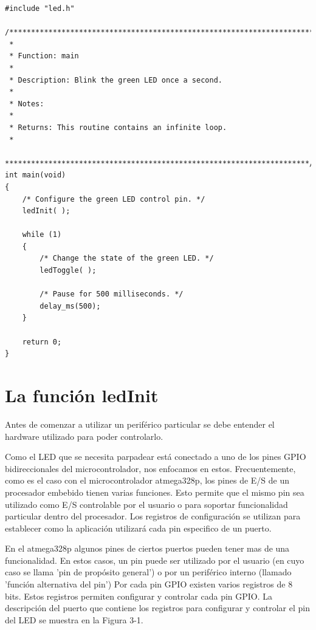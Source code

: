 \documentclass[12pt]{article}
\begin{document}
\begin{verbatim}
#include "led.h"

/**********************************************************************
 *
 * Function: main
 *
 * Description: Blink the green LED once a second.
 *
 * Notes:
 *
 * Returns: This routine contains an infinite loop.
 *
 **********************************************************************/
int main(void)
{
    /* Configure the green LED control pin. */
    ledInit( );

    while (1)
    {
        /* Change the state of the green LED. */
        ledToggle( );

        /* Pause for 500 milliseconds. */
        delay_ms(500);
    }

    return 0;
}
\end{verbatim}

\section *{La función ledInit}

Antes de comenzar a utilizar un periférico particular se debe entender el 
hardware utilizado para poder controlarlo.


Como el LED que se necesita parpadear está conectado a uno de los pines
GPIO bidireccionales del microcontrolador, nos enfocamos en estos.
Frecuentemente, como es el caso con el microcontrolador atmega328p, los
pines de E/S de un procesador embebido tienen varias funciones.
Esto permite que el mismo pin sea utilizado como E/S controlable por el usuario
o para soportar funcionalidad particular dentro del procesador.
Los registros de configuración se utilizan para establecer como la aplicación
utilizará cada pin especifico de un puerto.

En el atmega328p algunos pines de ciertos puertos pueden tener mas de 
una funcionalidad. En estos casos, un pin puede ser utilizado por el usuario
(en cuyo caso se llama 'pin de propósito general') o por un periférico interno (llamado 'función alternativa del pin')
Por cada pin GPIO 
existen varios registros de 8 bits. 
Estos registros permiten configurar y controlar cada pin GPIO.
La descripción del puerto que contiene los registros
para configurar y controlar el pin del LED se muestra en la Figura 3-1. 
\end{document}
